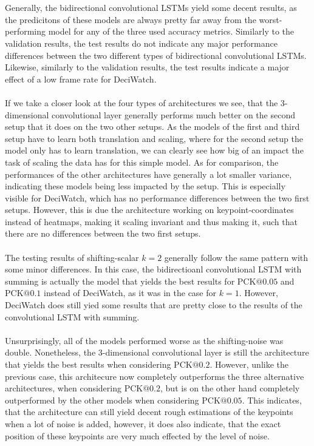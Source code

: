 \documentclass[./main.tex]{subfiles}
\begin{document}
\\
\\
Generally, the bidirectional convolutional LSTMs yield some decent results, as the predicitons of these models are always pretty far away from the worst-performing model for any of the three used accuracy metrics. Similarly to the validation results, the test results do not indicate any major performance differences between the two different types of bidirectional convolutional LSTMs. Likewise, similarly to the validation results, the test results indicate a major effect of a low frame rate for DeciWatch. 
\\
\\
If we take a closer look at the four types of architectures we see, that the 3-dimensional convolutional layer generally performs much better on the second setup that it does on the two other setups. As the models of the first and third setup have to learn both translation and scaling, where for the second setup the model only has to learn translation, we can clearly see how big of an impact the task of scaling the data has for this simple model. As for comparison, the performances of the other architectures have generally a lot smaller variance, indicating these models being less impacted by the setup. This is especially visible for DeciWatch, which has no performance differences between the two first setups. However, this is due the architecture working on keypoint-coordinates instead of heatmaps, making it scaling invariant and thus making it, such that there are no differences between the two first setups.
\\
\\
The testing results of shifting-scalar $k = 2$ generally follow the same pattern with some minor differences. In this case, the bidirectioanl convolutional LSTM with summing is actually the model that yields the best results for PCK$@0.05$ and PCK$@0.1$ instead of DeciWatch, as it was in the case for $k = 1$. However, DeciWatch does still yied some results that are pretty close to the results of the convolutional LSTM with summing.
\\
\\
Unsurprisingly, all of the models performed worse as the shifting-noise was double. Nonetheless, the 3-dimensional convolutional layer is still the architecture that yields the best results when considering PCK$@0.2$. However, unlike the previous case, this architecure now completely outperforms the three alternative architectures, when considering PCK$@0.2$, but is on the other hand completely outperformed by the other models when considering PCK$@0.05$. This indicates, that the architecture can still yield decent rough estimations of the keypoints when a lot of noise is added, however, it does also indicate, that the exact position of these keypoints are very much effected by the level of noise.
\end{document}
